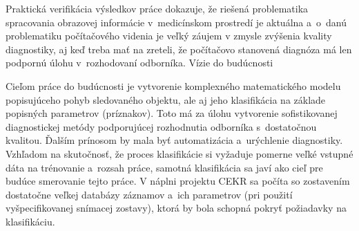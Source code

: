 Praktická verifikácia výsledkov práce dokazuje, že riešená problematika spracovania obrazovej informácie v medicínskom prostredí je aktuálna a o danú problematiku počítačového videnia je veľký záujem v zmysle zvýšenia kvality diagnostiky, aj keď treba mať na zreteli, že počítačovo stanovená diagnóza má len podpornú úlohu v rozhodovaní odborníka.
Vízie do budúcnosti

Cieľom práce do budúcnosti je vytvorenie komplexného matematického modelu popisujúceho pohyb sledovaného objektu, ale aj jeho klasifikácia na základe popisných parametrov (príznakov). Toto má za úlohu vytvorenie sofistikovanej diagnostickej metódy podporujúcej rozhodnutia odborníka s dostatočnou kvalitou. Ďalším prínosom by mala byť automatizácia a urýchlenie diagnostiky. 
Vzhľadom na skutočnosť, že proces klasifikácie si vyžaduje pomerne veľké vstupné dáta na trénovanie a rozsah práce, samotná klasifikácia sa javí ako cieľ pre budúce smerovanie tejto práce. V náplni projektu CEKR sa počíta so zostavením dostatočne veľkej databázy záznamov a ich parametrov (pri použití vyšpecifikovanej snímacej zostavy), ktorá by bola schopná pokryť požiadavky na klasifikáciu. 

